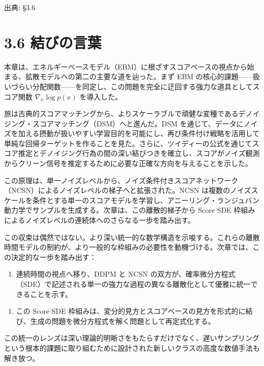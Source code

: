 

{\color{gray}\footnotesize 出典: §3.6\par}
\vspace{0.2em}
\section*{3.6 結びの言葉}



本章は、エネルギーベースモデル（EBM）に根ざすスコアベースの視点から始まる、拡散モデルへの第二の主要な道を辿った。まず EBM の核心的課題——扱いづらい分配関数——を同定し、この問題を完全に迂回する強力な道具としてスコア関数 $\nabla_x\log p(x)$ を導入した。

旅は古典的スコアマッチングから、よりスケーラブルで頑健な変種であるデノイジング・スコアマッチング（DSM）へと進んだ。DSM を通じて、データにノイズを加える摂動が扱いやすい学習目的を可能にし、再び条件付け戦略を活用して単純な回帰ターゲットを作ることを見た。さらに、ツイディーの公式を通じてスコア推定とデノイジング行為の間の深い結びつきを確立し、スコアがノイズ観測からクリーン信号を推定するために必要な正確な方向を与えることを示した。

この原理は、単一ノイズレベルから、ノイズ条件付きスコアネットワーク（NCSN）によるノイズレベルの梯子へと拡張された。NCSN は複数のノイズスケールを条件とする単一のスコアモデルを学習し、アニーリング・ランジュバン動力学でサンプルを生成する。次章は、この離散的梯子から Score SDE 枠組みによるノイズレベルの連続体へのさらなる一歩を踏み出す。

この収束は偶然ではない。より深い統一的な数学構造を示唆する。これらの離散時間モデルの制約が、より一般的な枠組みの必要性を動機づける。次章では、この決定的な一歩を踏み出す：

\begin{enumerate}
\item 連続時間の視点へ移り、DDPM と NCSN の双方が、確率微分方程式（SDE）で記述される単一の強力な過程の異なる離散化として優雅に統一できることを示す。
\end{enumerate}


\begin{enumerate}
\item この Score SDE 枠組みは、変分的見方とスコアベースの見方を形式的に結び、生成の問題を微分方程式を解く問題として再定式化する。
\end{enumerate}


この統一のレンズは深い理論的明晰さをもたらすだけでなく、遅いサンプリングという根本的課題に取り組むために設計された新しいクラスの高度な数値手法も解き放つ。

